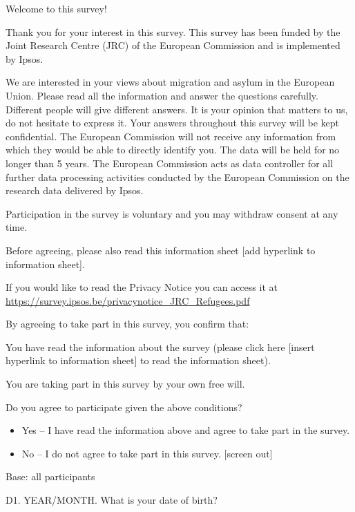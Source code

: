 \documentclass[
  12pt,
  a4paper,
]{article}
\providecommand{\tightlist}{%
  \setlength{\itemsep}{0pt}\setlength{\parskip}{0pt}}
\begin{document}
Welcome to this survey!

Thank you for your interest in this survey. This survey has been funded by the Joint Research Centre (JRC) of the European Commission and is implemented by Ipsos.

We are interested in your views about migration and asylum in the European Union. Please read all the information and answer the questions carefully. Different people will give different answers. It is your opinion that matters to us, do not hesitate to express it.
Your answers throughout this survey will be kept confidential. The European Commission will not receive any information from which they would be able to directly identify you. The data will be held for no longer than 5 years. The European Commission acts as data controller for all further data processing activities conducted by the European Commission on the research data delivered by Ipsos.

Participation in the survey is voluntary and you may withdraw consent at any time.

Before agreeing, please also read this information sheet {[}add hyperlink to information sheet{]}.

If you would like to read the Privacy Notice you can access it at \url{https://survey.ipsos.be/privacynotice_JRC_Refugees.pdf}

By agreeing to take part in this survey, you confirm that:

You have read the information about the survey (please click here {[}insert hyperlink to information sheet{]} to read the information sheet).

You are taking part in this survey by your own free will.

Do you agree to participate given the above conditions?

\begin{itemize}
\tightlist
\item
  Yes -- I have read the information above and agree to take part in the survey.
\item
  No -- I do not agree to take part in this survey. {[}screen out{]}
\end{itemize}

Base: all participants

D1. YEAR/MONTH. What is your date of birth?
\end{document}
